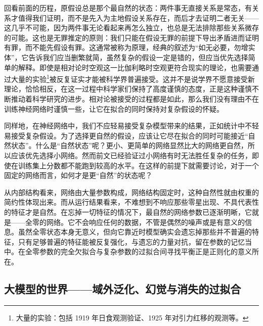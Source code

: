 回看前面的历程，原假设总是那个最自然的状态：两件事无直接关系是常态，有关系才值得我们证明，而不是先入为主地假设关系存在，而后才去证明二者无关——这几乎不可能，因为两件事无论看起来再怎么独立，也总是无法排除那些关系微存的可能。这也是无罪推定的原则：我们只能在假设无罪的前提下导出矛盾进而证明有罪，而不能先假设有罪。这通常被称为原理，经典的叙述为“如无必要，勿增实体”，它告诉我们应当删繁就简，虽然复杂的假设一定是错的，但应当优先选择简单的解释。即使是相对论时空观这一比伽利略时空观更符合现实的理论，也需要通过大量的实验\footnote{大量的实验：包括 1919 年日食观测验证、1925 年对引力红移的观测等。}被反复证实才能被科学界普遍接受。这并不是说学界不愿意接受新理论，恰恰相反，在这一过程中科学家们保持了高度谨慎的态度，正是这种谨慎不断推动着科学研究的进步。相对论被接受的过程都是如此，那么我们没有理由不在训练神经网络时谨慎一些，让它在拟合的同时保持对复杂假设的怀疑。

同样地，在神经网络中，我们不应轻易接受复杂模型带来的结果，正如统计中不轻易接受复杂假设。为了选择更自然的假设，应该让它尽在拟合的同时可能接近“自然状态”。什么是“自然状态”呢？更小、更简单的网络显然比大的网络更自然，所以应该优先选择小网络。然而前文已经验证过小网络有时无法胜任复杂的任务，即使在训练集上分数都不能跑到较高的水平。在这样的前提下就需要讨论，对于一个固定的网络而言，如何才是更“自然”的状态呢？

从内部结构看来，网络由大量参数构成，网络结构固定时，这种自然性就由权重的简约性体现出来。而从运行结果看来，不难想到不响应那些零星出现、不具代表性的特征才是自然。在忘掉一切特征的情况下，最自然的网络参数已逐渐明晰，它就是——全零的网络。它不会响应任何的数据，不管是偶然的噪声或是有意义的信息。虽然全零状态本身无意义，但向它靠近时模型确实会遗忘掉那些并不普遍的特征，只有足够普遍的特征能被反复强化，与遗忘的力量对抗，留在参数的记忆当中。在全零参数的完全欠拟合与复杂参数的过拟合间寻找平衡正是正则化的意义所在。

\newpage

\subsection{大模型的世界——域外泛化、幻觉与消失的过拟合}